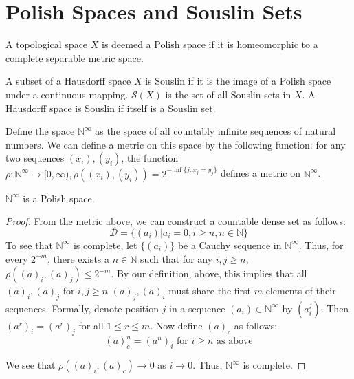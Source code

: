 \documentclass[main.tex]{subfiles}
\begin{document}
 \section{Polish Spaces and Souslin Sets}

\begin{definition}
 A topological space $X$ is deemed a Polish space if it is homeomorphic to a complete separable metric space.
\end{definition}

\begin{definition}
 A subset of  a Hausdorff space $X$ is Souslin if it is the image of a Polish space under a continuous mapping. $\mathcal{S}(X)$ is the set of all Souslin sets in $X$. A Hausdorff space is Souslin if itself is a Souslin set.
\end{definition}

\begin{definition}
 Define the space $\mathbb{N}^{\infty}$ as the space of all countably infinite sequences of natural numbers. We can define a metric on this space by the following function: for any two sequences $(x_i),(y_i)$, the function $\rho: \mathbb{N}^{\infty} \rightarrow [0,\infty), \rho((x_i),(y_i)) = 2^{-\inf \{j : x_j = y_j\}}$ defines a metric on $\mathbb{N}^{\infty}$.
\end{definition}

\begin{theorem}
 $\mathbb{N}^{\infty}$ is a Polish space.
\end{theorem}

\begin{proof}
 From the metric above, we can construct a countable dense set as follows:
 $$\mathcal{D} = \{ (a_i) \vert a_i = 0, i \geq n, n \in \mathbb{N} \} $$
 To see that $\mathbb{N}^{\infty}$ is complete, let $\{(a_i)\}$ be a Cauchy sequence in $\mathbb{N}^{\infty}$. Thus, for every $2^{-m}$, there exists a $n \in \mathbb{N}$ such that for any $i,j \geq n$, $\rho((a)_i,(a)_j) \leq 2^{-m}$. By our definition, above, this implies that all $(a)_i,(a)_j$ for $i,j \geq n$ $(a)_j, (a)_i$ must share the first $m$ elements of their sequences. Formally, denote position $j$ in a sequence $(a_i) \in \mathbb{N}^{\infty}$ by $(a_i^j)$.
 Then $(a^r)_i = (a^r)_j$ for all $1\leq r \leq m$. Now define $(a)_c$ as follows:
 $$(a)_c^n = (a^n)_i \text{ for $i \geq n$ as above}$$
 
 We see that $\rho((a)_i,(a)_c) \rightarrow 0$ as $i \rightarrow 0$. Thus, $\mathbb{N}^{\infty}$ is complete.
\end{proof}
\end{document}
